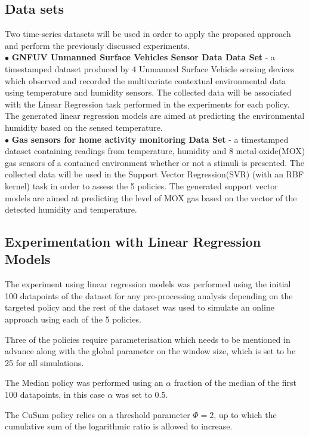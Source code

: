 \documentclass{mpaper}
\begin{document}
\subsection{Data sets}
Two time-series datasets will be used in order to apply the proposed approach and perform the previously discussed experiments.
\\$\bullet$ \textbf{GNFUV Unmanned Surface Vehicles Sensor Data Data Set} \cite{harth2018} - a timestamped dataset produced by 4 Unmanned Surface Vehicle sensing devices which observed and recorded the multivariate contextual environmental data using temperature and humidity sensors. The collected data will be associated with the Linear Regression task performed in the experiments for each policy. The generated linear regression models are aimed at predicting the environmental humidity based on the sensed temperature.
\\$\bullet$ \textbf{Gas sensors for home activity monitoring Data Set } \cite{HUERTA2016169} - a timestamped dataset containing readings from temperature, humidity and 8 metal-oxide(MOX) gas sensors of a contained environment whether or not a stimuli is presented. The collected data will be used in the Support Vector Regression(SVR) (with an RBF kernel) task in order to assess the 5 policies. The generated support vector models are aimed at predicting the level of MOX gas based on the vector of the detected humidity and temperature.

\subsection{Experimentation with Linear Regression Models}
The experiment using linear regression models was performed using the initial 100 datapoints of the dataset for any pre-processing analysis depending on the targeted policy and the rest of the dataset was used to simulate an online approach using each of the 5 policies.

Three of the policies require parameterisation which needs to be mentioned in advance along with the global parameter on the window size, which is set to be 25 for all simulations.

The Median policy was performed using an $\alpha$ fraction of the median of the first 100 datapoints, in this case $\alpha$ was set to 0.5.

The CuSum policy relies on a threshold parameter $\Phi = 2$, up to which the cumulative sum of the logarithmic ratio is allowed to increase.
\end{document}
